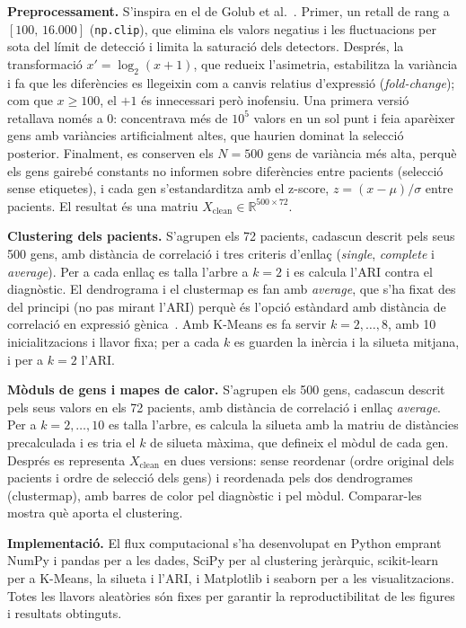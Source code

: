\documentclass[a4paper,11pt]{article}
\begin{document}
\textbf{Preprocessament.} S'inspira en el de Golub et al.~\cite{golub}. Primer, un retall de rang a $[100,\,16.000]$ (\texttt{np.clip}), que elimina els valors negatius i les fluctuacions per sota del límit de detecció i limita la saturació dels detectors. Després, la transformació $x'=\log_2(x+1)$, que redueix l'asimetria, estabilitza la variància i fa que les diferències es llegeixin com a canvis relatius d'expressió (\emph{fold-change}); com que $x\ge100$, el $+1$ és innecessari però inofensiu. Una primera versió retallava només a 0: concentrava més de $10^5$ valors en un sol punt i feia aparèixer gens amb variàncies artificialment altes, que haurien dominat la selecció posterior. Finalment, es conserven els $N=500$ gens de variància més alta, perquè els gens gairebé constants no informen sobre diferències entre pacients (selecció sense etiquetes), i cada gen s'estandarditza amb el z-score, $z=(x-\mu)/\sigma$ entre pacients. El resultat és una matriu $X_{\text{clean}}\in\mathbb{R}^{500\times72}$.

\textbf{Clustering dels pacients.} S'agrupen els 72 pacients, cadascun descrit pels seus 500 gens, amb distància de correlació i tres criteris d'enllaç (\emph{single}, \emph{complete} i \emph{average}). Per a cada enllaç es talla l'arbre a $k=2$ i es calcula l'ARI contra el diagnòstic. El dendrograma i el clustermap es fan amb \emph{average}, que s'ha fixat des del principi (no pas mirant l'ARI) perquè és l'opció estàndard amb distància de correlació en expressió gènica~\cite{eisen}. Amb K-Means es fa servir $k=2,\dots,8$, amb 10 inicialitzacions i llavor fixa; per a cada $k$ es guarden la inèrcia i la silueta mitjana, i per a $k=2$ l'ARI.

\textbf{Mòduls de gens i mapes de calor.} S'agrupen els 500 gens, cadascun descrit pels seus valors en els 72 pacients, amb distància de correlació i enllaç \emph{average}. Per a $k=2,\dots,10$ es talla l'arbre, es calcula la silueta amb la matriu de distàncies precalculada i es tria el $k$ de silueta màxima, que defineix el mòdul de cada gen. Després es representa $X_{\text{clean}}$ en dues versions: sense reordenar (ordre original dels pacients i ordre de selecció dels gens) i reordenada pels dos dendrogrames (clustermap), amb barres de color pel diagnòstic i pel mòdul. Comparar-les mostra què aporta el clustering.

\textbf{Implementació.} El flux computacional s'ha desenvolupat en Python emprant NumPy i pandas per a les dades, SciPy per al clustering jeràrquic, scikit-learn~\cite{sklearn} per a K-Means, la silueta i l'ARI, i Matplotlib i seaborn per a les visualitzacions. Totes les llavors aleatòries són fixes per garantir la reproductibilitat de les figures i resultats obtinguts.
\end{document}
